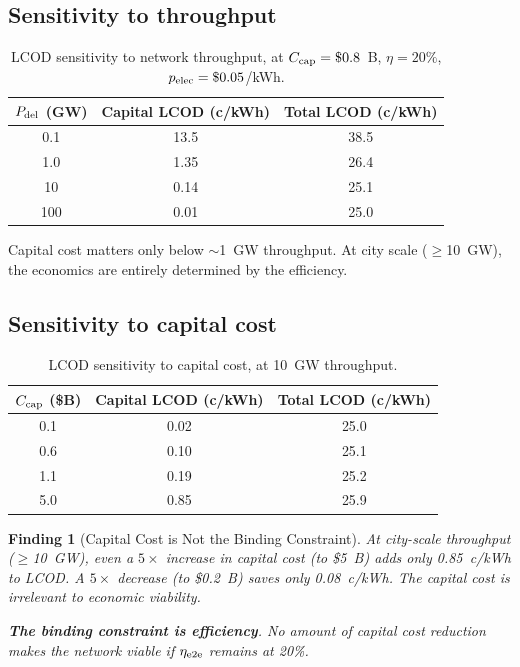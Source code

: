 \documentclass[11pt]{article}
\newtheorem{finding}{Finding}
\begin{document}
\subsection{Sensitivity to throughput}

\begin{table}[h]
\centering
\caption{LCOD sensitivity to network throughput, at $C_{\rm cap} = \$0.8$~B,
$\eta = 20\%$, $p_{\rm elec} = \$0.05$/kWh.}
\label{tab:sensitivity-throughput}
\begin{tabular}{ccc}
\toprule
$P_{\rm del}$ (GW) & Capital LCOD (c/kWh) & Total LCOD (c/kWh) \\
\midrule
0.1 & 13.5 & 38.5 \\
1.0 & 1.35 & 26.4 \\
10 & 0.14 & 25.1 \\
100 & 0.01 & 25.0 \\
\bottomrule
\end{tabular}
\end{table}

Capital cost matters only below $\sim$1~GW throughput. At city scale
($\geq$10~GW), the economics are entirely determined by the efficiency.

\subsection{Sensitivity to capital cost}

\begin{table}[h]
\centering
\caption{LCOD sensitivity to capital cost, at 10~GW throughput.}
\label{tab:sensitivity-cap}
\begin{tabular}{ccc}
\toprule
$C_{\rm cap}$ (\$B) & Capital LCOD (c/kWh) & Total LCOD (c/kWh) \\
\midrule
0.1 & 0.02 & 25.0 \\
0.6 & 0.10 & 25.1 \\
1.1 & 0.19 & 25.2 \\
5.0 & 0.85 & 25.9 \\
\bottomrule
\end{tabular}
\end{table}

\begin{finding}[Capital Cost is Not the Binding Constraint]
\label{find:capital-not-binding}
At city-scale throughput ($\geq$10~GW), even a $5\times$ increase in
capital cost (to \$5~B) adds only 0.85~c/kWh to LCOD. A $5\times$
decrease (to \$0.2~B) saves only 0.08~c/kWh. The capital cost is
irrelevant to economic viability.

\textbf{The binding constraint is efficiency}. No amount of capital
cost reduction makes the network viable if $\eta_{\rm e2e}$ remains
at 20\%.
\end{finding}
\end{document}
